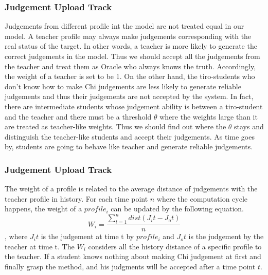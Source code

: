  \subsubsection{Judgement Upload Track}
 Judgements from different profile int the model are not treated equal in our model. A teacher profile may always make judgements corresponding with the real status of the target. In other words, a teacher is more likely to generate the correct judgements in the model. Thus we should accept all the judgements from the teacher and treat them as Oracle who always knows the truth. Accordingly, the weight of a teacher is set to be 1. On the other hand, the tiro-students who don't know how to make Chi judgements are less likely to generate reliable judgements and thus their judgements are not accepted by the system. In fact, there are intermediate students whose judgement ability is between a tiro-student and the teacher and there must be a threshold $\theta$ where the weights large than it are treated as teacher-like weights. Thus we should find out where the $\theta$ stays and distinguish the teacher-like students and accept their judgements. As time goes by, students are going to behave like teacher and generate reliable judgements.
 

  \subsubsection{Judgement Upload Track}
 The weight of a profile is related to the average distance of judgements with the teacher profile in history. For each time point $n$ where the computation cycle happens, the weight of a $profile_i$ can be updated by the following equation.
\begin{equation}
  W_i= \dfrac{\sum_{t=1}^{n} dist( J_it - J_ot )}{n}
\end{equation},
where $J_it$ is the judgement at time t by $profile_i$ and $J_ot$ is the judgement by the teacher at time t. The $W_i$ considers all the history distance of a specific profile to the teacher. If a student knows nothing about making Chi judgement at first and finally grasp the method, and his judgments will be accepted after a time point $t$. 